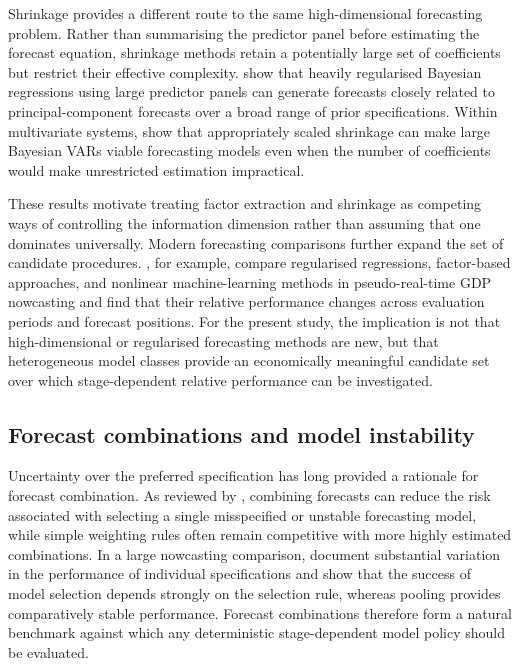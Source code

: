Shrinkage provides a different route to the same high-dimensional forecasting
problem. Rather than summarising the predictor panel before estimating the
forecast equation, shrinkage methods retain a potentially large set of
coefficients but restrict their effective complexity.
\citet{demol2008shrinkage} show that heavily regularised Bayesian regressions
using large predictor panels can generate forecasts closely related to
principal-component forecasts over a broad range of prior specifications.
Within multivariate systems, \citet{banbura2010largebvar} show that appropriately
scaled shrinkage can make large Bayesian VARs viable forecasting models even
when the number of coefficients would make unrestricted estimation impractical.

These results motivate treating factor extraction and shrinkage as competing
ways of controlling the information dimension rather than assuming that one
dominates universally. Modern forecasting comparisons further expand the set of
candidate procedures. \citet{kantpickwinter2025ml}, for example, compare
regularised regressions, factor-based approaches, and nonlinear
machine-learning methods in pseudo-real-time GDP nowcasting and find that their
relative performance changes across evaluation periods and forecast positions.
For the present study, the implication is not that high-dimensional or
regularised forecasting methods are new, but that heterogeneous model classes
provide an economically meaningful candidate set over which stage-dependent
relative performance can be investigated.


\subsection{Forecast combinations and model instability}
\label{subsec:lit_combinations}

Uncertainty over the preferred specification has long provided a rationale for
forecast combination. As reviewed by \citet{timmermann2006combinations},
combining forecasts can reduce the risk associated with selecting a single
misspecified or unstable forecasting model, while simple weighting rules often
remain competitive with more highly estimated combinations. In a large
nowcasting comparison, \citet{kuzin2013pooling} document substantial variation
in the performance of individual specifications and show that the success of
model selection depends strongly on the selection rule, whereas pooling
provides comparatively stable performance. Forecast combinations therefore
form a natural benchmark against which any deterministic stage-dependent model
policy should be evaluated.

